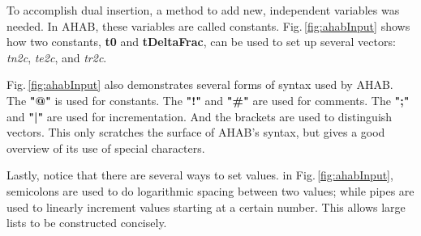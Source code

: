 To accomplish dual insertion, a method to add new, independent variables was needed.  In AHAB, these variables are called constants.  Fig.\,\ref{fig:ahabInput} shows how two constants, \textbf{t0} and \textbf{tDeltaFrac}, can be used to set up several vectors: \textit{tn2c}, \textit{te2c}, and \textit{tr2c}.

Fig.\,\ref{fig:ahabInput} also demonstrates several forms of syntax used by AHAB.  The \textbf{"@"} is used for constants.  The \textbf{"!"} and \textbf{"\#"} are used for comments.  The \textbf{";"} and \textbf{"|"} are used for incrementation.  And the brackets are used to distinguish vectors.  This only scratches the surface of AHAB's syntax, but gives a good overview of its use of special characters.

Lastly, notice that there are several ways to set values.  in Fig.\,\ref{fig:ahabInput}, semicolons are used to do logarithmic spacing between two values; while pipes are used to linearly increment values starting at a certain number.  This allows large lists to be constructed concisely.

